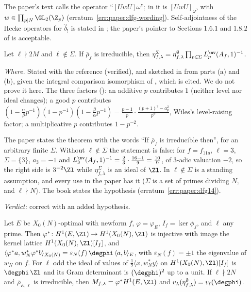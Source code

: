 \begin{sloppypar}
The paper's text calls the operator ``$[UwU]\omega$''; in \cite{DFG04} it is $[UwU]_\omega$, with $w\in\prod_{p\mid N}\GL_2(\Z_p)$ (erratum~\ref{err:paper:dfg-wording}). Self-adjointness of the Hecke
operators for $\hat\delta_!$ is stated in \cite[Section 1.8.2, (25)]{DFG04}; the paper's pointer to Sections 1.6.1 and 1.8.2 of \cite{DFG04} is acceptable.

\begin{theorem}\label{thm:paper:dfg14}
Let $\ell\nmid2M$ and $\ell\notin\Sigma$. If $\bar\rho_f$ is irreducible, then $\eta^\Sigma_{f,\lambda}=\eta^\emptyset_{f,\lambda}\prod_{p\in\Sigma}L^{\nv}_p(A_f,1)^{-1}$.
\end{theorem}

\noindent\emph{Where.} Stated with the reference \cite[Proposition 1.4(c)]{DFG04} (verified), and sketched in  from parts (a) and (b), given the integral
comparison isomorphism of \cite{DFG04}, which is cited. We do not prove it here. The three factors (): an additive $p$ contributes $1$ (neither level nor
ideal changes); a good $p$ contributes $(1-\frac\alpha\beta p^{-1})(1-p^{-1})(1-\frac\beta\alpha p^{-1})=\frac{p-1}p\cdot\frac{(p+1)^2-a_p^2}{p^2}$, Wiles's level-raising factor; a multiplicative $p$ contributes
$1-p^{-2}$.

\begin{warning}\label{warn:paper:dfg14}
The paper states the theorem with the words ``If $\bar\rho_f$ is irreducible then'', for an arbitrary finite $\Sigma$. Without $\ell\notin\Sigma$ the statement is false: for $f=f_{11a}$, $\ell=3$,
$\Sigma=\{3\}$, $a_3=-1$ and $L^{\nv}_3(A_f,1)^{-1}=\frac23\cdot\frac{16-1}9=\frac{10}9$, of $3$-adic valuation $-2$, so the right side is $3^{-2}\Zl$ while $\eta^\Sigma_{f,\lambda}$ is an ideal of $\Zl$.
In \cite[Section 1.7.3]{DFG04} $\ell\notin\Sigma$ is a standing assumption, and every use in the paper has it ($\Sigma$ is a set of primes dividing $N$, and $\ell\nmid N$). The book states the
hypothesis (erratum~\ref{err:paper:dfg14}).
\end{warning}

\noindent\emph{Verdict:} correct with an added hypothesis.

\begin{proposition}\label{prop:paper:pullback}
Let $E$ be $X_0(N)$-optimal with newform $f$, $\varphi=\varphi_E$, $I_f=\ker\phi_f$, and $\ell$ any prime. Then $\varphi^*\colon H^1(E,\Zl)\to H^1(X_0(N),\Zl)$ is injective with image the kernel lattice
$H^1(X_0(N),\Zl)[I_f]$, and $\langle\varphi^*a,w_N^*\varphi^*b\rangle_{X_0(N)}=\varepsilon_N(f)\,\degphi\,\langle a,b\rangle_E$, with $\varepsilon_N(f)=\pm1$ the eigenvalue of $w_N$ on $f$. For $\ell$ odd the ideal of values of
$\frac12\langle x,w_N^*y\rangle$ on $H^1(X_0(N),\Zl)[I_f]$ is $\degphi\,\Zl$ and its Gram determinant is $(\degphi)^2$ up to a unit. If $\ell\nmid2N$ and $\bar\rho_{E,\ell}$ is irreducible, then
$M_{f,\lambda}=\varphi^*H^1(E,\Zl)$ and $v_\lambda(\eta^\emptyset_{f,\lambda})=v_\ell(\degphi)$.
\end{proposition}


\end{sloppypar}
